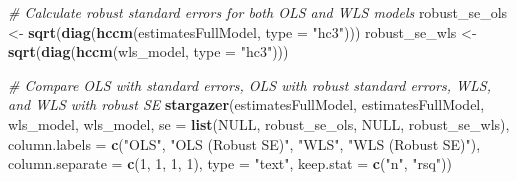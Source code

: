 \documentclass[
]{article}
\newenvironment{Shaded}{\begin{snugshade}}{\end{snugshade}}
\newcommand{\AttributeTok}[1]{\textcolor[rgb]{0.13,0.29,0.53}{#1}}
\newcommand{\CommentTok}[1]{\textcolor[rgb]{0.56,0.35,0.01}{\textit{#1}}}
\newcommand{\ConstantTok}[1]{\textcolor[rgb]{0.56,0.35,0.01}{#1}}
\newcommand{\DecValTok}[1]{\textcolor[rgb]{0.00,0.00,0.81}{#1}}
\newcommand{\FunctionTok}[1]{\textcolor[rgb]{0.13,0.29,0.53}{\textbf{#1}}}
\newcommand{\NormalTok}[1]{#1}
\newcommand{\OtherTok}[1]{\textcolor[rgb]{0.56,0.35,0.01}{#1}}
\newcommand{\StringTok}[1]{\textcolor[rgb]{0.31,0.60,0.02}{#1}}
\begin{document}
\begin{Shaded}
\begin{Highlighting}[]
\CommentTok{\# Calculate robust standard errors for both OLS and WLS models}
\NormalTok{robust\_se\_ols }\OtherTok{\textless{}{-}} \FunctionTok{sqrt}\NormalTok{(}\FunctionTok{diag}\NormalTok{(}\FunctionTok{hccm}\NormalTok{(estimatesFullModel, }\AttributeTok{type =} \StringTok{"hc3"}\NormalTok{)))}
\NormalTok{robust\_se\_wls }\OtherTok{\textless{}{-}} \FunctionTok{sqrt}\NormalTok{(}\FunctionTok{diag}\NormalTok{(}\FunctionTok{hccm}\NormalTok{(wls\_model, }\AttributeTok{type =} \StringTok{"hc3"}\NormalTok{)))}

\CommentTok{\# Compare OLS with standard errors, OLS with robust standard errors, WLS, and WLS with robust SE}
\FunctionTok{stargazer}\NormalTok{(estimatesFullModel, estimatesFullModel, wls\_model, wls\_model,}
          \AttributeTok{se =} \FunctionTok{list}\NormalTok{(}\ConstantTok{NULL}\NormalTok{, robust\_se\_ols, }\ConstantTok{NULL}\NormalTok{, robust\_se\_wls),}
          \AttributeTok{column.labels =} \FunctionTok{c}\NormalTok{(}\StringTok{"OLS"}\NormalTok{, }\StringTok{"OLS (Robust SE)"}\NormalTok{, }\StringTok{"WLS"}\NormalTok{, }\StringTok{"WLS (Robust SE)"}\NormalTok{),}
          \AttributeTok{column.separate =} \FunctionTok{c}\NormalTok{(}\DecValTok{1}\NormalTok{, }\DecValTok{1}\NormalTok{, }\DecValTok{1}\NormalTok{, }\DecValTok{1}\NormalTok{),}
          \AttributeTok{type =} \StringTok{"text"}\NormalTok{, }\AttributeTok{keep.stat =} \FunctionTok{c}\NormalTok{(}\StringTok{"n"}\NormalTok{, }\StringTok{"rsq"}\NormalTok{))}
\end{Highlighting}
\end{Shaded}
\end{document}
